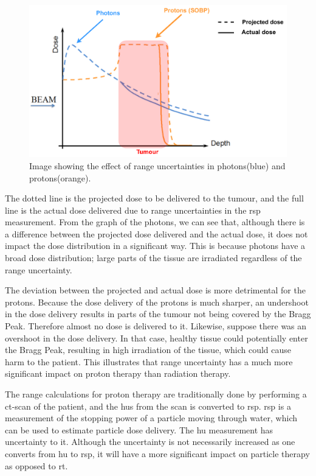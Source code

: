 \documentclass[main.tex]{subfiles}
\begin{document}
\begin{figure}[!htpb]
    \centering
    \includegraphics[width=12cm ]{images/projected_dose_graph.pdf}
    \caption{Image showing the effect of range uncertainties in photons(blue) and protons(orange)\cite{proton_challenges}.}
    \label{fig: proton_uncertainty}
\end{figure}
\FloatBarrier


 The dotted line is the projected dose to be delivered to the tumour, and the full line is the actual dose delivered due to range uncertainties in the \gls{rsp} measurement. From the graph of the photons, we can see that, although there is a difference between the projected dose delivered and the actual dose, it does not impact the dose distribution in a significant way. This is because photons have a broad dose distribution; large parts of the tissue are irradiated regardless of the range uncertainty.
 
 The deviation between the projected and actual dose is more detrimental for the protons. Because the dose delivery of the protons is much sharper, an undershoot in the dose delivery results in parts of the tumour not being covered by the Bragg Peak. Therefore almost no dose is delivered to it. Likewise, suppose there was an overshoot in the dose delivery. In that case, healthy tissue could potentially enter the Bragg Peak, resulting in high irradiation of the tissue, which could cause harm to the patient. This illustrates that range uncertainty has a much more significant impact on proton therapy than radiation therapy.

The range calculations for proton therapy are traditionally done by performing a \gls{ct}-scan of the patient, and the \acrlong{hu}s from the scan is converted to \gls{rsp}. \gls{rsp} is a measurement of the stopping power of a particle moving through water, which can be used to estimate particle dose delivery. The \gls{hu} measurement has uncertainty to it. Although the uncertainty is not necessarily increased as one converts from \gls{hu} to \gls{rsp}, it will have a more significant impact on particle therapy as opposed to \gls{rt}\cite{proton_challenges}.
\end{document}
